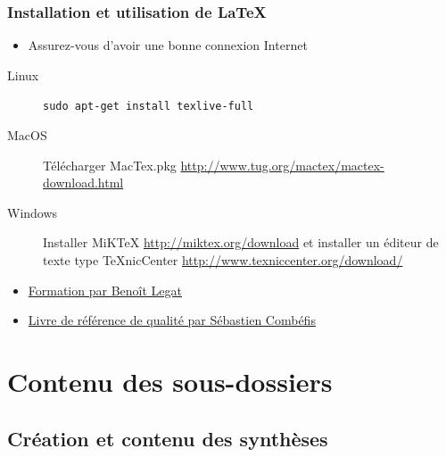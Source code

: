 \documentclass{beamer}
\begin{document}
\begin{frame}[fragile]
    \frametitle{Installation et utilisation de \LaTeX}
    \begin{itemize}
        \item Assurez-vous d'avoir une bonne connexion Internet
    \end{itemize}
    \begin{description}
        \item[Linux] \verb#sudo apt-get install texlive-full#
        \item[MacOS] Télécharger MacTex.pkg
            \url{http://www.tug.org/mactex/mactex-download.html}
        \item[Windows] Installer MiKTeX \url{http://miktex.org/download}
            et installer un éditeur de texte type TeXnicCenter
            \url{http://www.texniccenter.org/download/}
    \end{description}
    \begin{itemize}
        \item
            \href{https://github.com/blegat/LaTeXconf/blob/master/main.pdf}{Formation
            par Benoît Legat}
        \item
            \href{http://www.latex-howto.be/files/LaTeX-HowTo-full.pdf}{Livre
            de référence de qualité par Sébastien Combéfis}
    \end{itemize}
\end{frame}

\section{Contenu des sous-dossiers}

\subsection{Création et contenu des synthèses}
\end{document}
